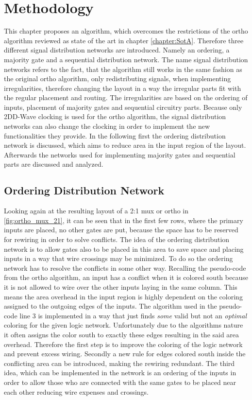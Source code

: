 \chapter{Methodology}\label{chapter:Methodology}
This chapter proposes an algorithm, which overcomes the restrictions of the ortho algorithm reviewed as state of the art in chapter \ref{chapter:SotA}. Therefore three different signal distribution networks are introduced. Namely an ordering, a majority gate and a sequential distribution network. The name signal distribution networks refers to the fact, that the algorithm still works in the same fashion as the original ortho algorithm, only redistributing signals, when implementing irregularities, therefore changing the layout in a way the irregular parts fit with the regular placement and routing. The irregularities are based on the ordering of inputs, placement of majority gates and sequential circuitry parts. Because only 2DD-Wave clocking is used for the ortho algorithm, the signal distribution networks can also change the clocking in order to implement the new functionalities they provide. In the following first the ordering distribution network is discussed, which aims to reduce area in the input region of the layout. Afterwards the networks used for implementing majority gates and sequential parts are discussed and analyzed.

\section{Ordering Distribution Network}
Looking again at the resulting layout of a 2:1 mux or ortho in \ref{fig:ortho_mux_21}, it can be seen that in the first few rows, where the primary inputs are placed, no other gates are put, because the space has to be reserved for rewiring in order to solve conflicts. The idea of the ordering distribution network is to allow gates also to be placed in this area to save space and placing inputs in a way that wire crossings may be minimized. To do so the ordering network has to resolve the conflicts in some other way. Recalling the pseudo-code from the ortho algorithm, an input has a conflict when it is colored south because it is not allowed to wire over the other inputs laying in the same column. This means the area overhead in the input region is highly dependent on the coloring assigned to the outgoing edges of the inputs. The algorithm used in the pseudo-code line $3$ is implemented in a way that just finds \textit{some} valid but not an \textit{optimal} coloring for the given logic network. Unfortunately due to the algorithms nature it often assigns the color south to exactly these edges resulting in the said area overhead. Therefore the first step is to improve the coloring of the logic network and prevent excess wiring. Secondly a new rule for edges colored south inside the conflicting area can be introduced, making the rewiring redundant. The third idea, which can be implemented in the network is an ordering of the inputs in order to allow those who are connected with the same gates to be placed near each other reducing wire expenses and crossings.


